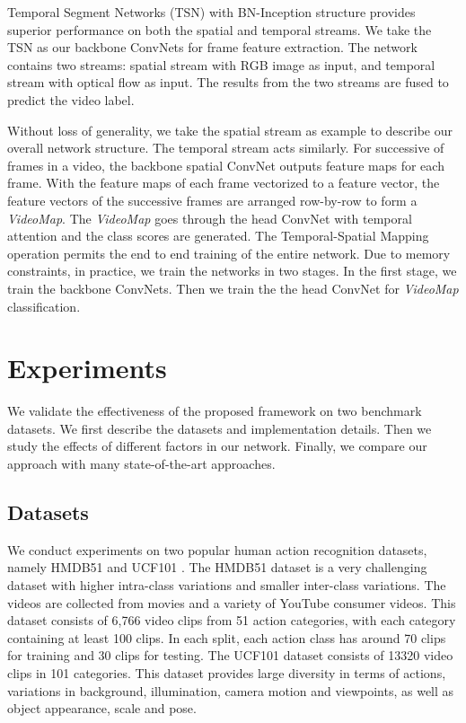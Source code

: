 \documentclass[english, 10pt, twocolumn, twoside]{IEEEtran}
\begin{document}
Temporal Segment Networks (TSN) \cite{wang2016temporal} with BN-Inception structure \cite{ioffe2015batch} provides superior performance on both the spatial and temporal streams. We take the TSN as our backbone ConvNets for frame feature extraction. The network contains two streams: spatial stream with RGB image as input, and temporal stream with optical flow as input. The results from the two streams are fused to predict the video label.

Without loss of generality, we take the spatial stream as example to describe our overall network structure. The temporal stream acts similarly. For successive of frames in a video, the backbone spatial ConvNet outputs feature maps for each frame. With the feature maps of each frame vectorized to a feature vector, the feature vectors of the successive frames are arranged row-by-row to form a \emph{VideoMap}. The \emph{VideoMap} goes through the head ConvNet with temporal attention and the class scores are generated. The Temporal-Spatial Mapping operation permits the end to end training of the entire network. Due to memory constraints, in practice, we train the networks in two stages. In the first stage, we train the backbone ConvNets. Then we train the the head ConvNet for \emph{VideoMap} classification.





\section{Experiments}
\label{secExperiments}
We validate the effectiveness of the proposed framework on two benchmark datasets. We first describe the datasets and implementation details. Then we study the effects of different factors in our network. Finally, we compare our approach with many state-of-the-art approaches. 

\subsection{Datasets}


We conduct experiments on two popular human action recognition datasets, namely HMDB51 \cite{kuehne2011hmdb} and UCF101 \cite{soomro2012ucf101}. The HMDB51 dataset is a very challenging dataset with higher intra-class variations and smaller inter-class variations. The videos are collected from movies and a variety of YouTube consumer videos. This dataset consists of 6,766 video clips from 51 action categories, with each category containing at least 100 clips. In each split, each action class has around 70 clips for training and 30 clips for testing. The UCF101 dataset consists of 13320 video clips in 101 categories. This dataset provides large diversity in terms of actions, variations in background, illumination, camera motion and viewpoints, as well as object appearance, scale and pose.
\end{document}
